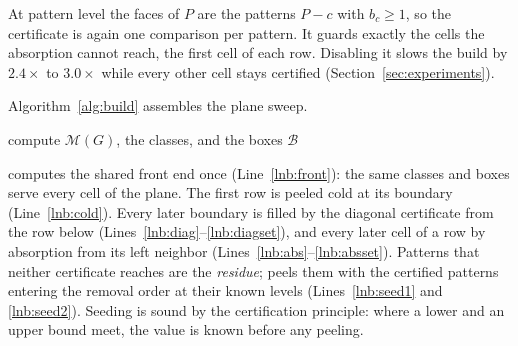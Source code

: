 At pattern level the faces of $P$ are the patterns $P-c$ with $b_c\ge1$, so the certificate is again one comparison per pattern.
%
It guards exactly the cells the absorption cannot reach, the first cell of each row.
%
Disabling it slows the build by $2.4\times$ to $3.0\times$ while every other cell stays certified (Section~\ref{sec:experiments}).

Algorithm~\ref{alg:build} assembles the plane sweep.

\begin{algorithm}[t]
\caption{\buildalg: compute every cell of the plane.}
\label{alg:build}
\algfontsize
{}
compute $\mathcal{M}(G)$, the classes, and the boxes $\mathcal{B}$\label{lnb:front}\;
\end{algorithm}

\buildalg{} computes the shared front end once (Line~\ref{lnb:front}): the same classes and boxes serve every cell of the plane.
%
The first row is peeled cold at its boundary (Line~\ref{lnb:cold}).
%
Every later boundary is filled by the diagonal certificate from the row below (Lines~\ref{lnb:diag}--\ref{lnb:diagset}), and every later cell of a row by absorption from its left neighbor (Lines~\ref{lnb:abs}--\ref{lnb:absset}).
%
Patterns that neither certificate reaches are the \emph{residue}; \peelcell{} peels them with the certified patterns entering the removal order at their known levels (Lines~\ref{lnb:seed1} and \ref{lnb:seed2}).
%
Seeding is sound by the certification principle: where a lower and an upper bound meet, the value is known before any peeling.

